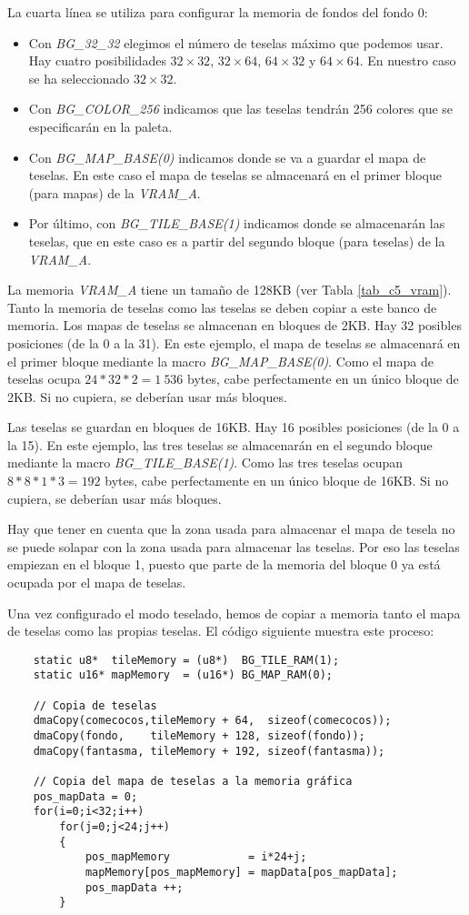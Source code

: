 La cuarta línea se utiliza para configurar la memoria de fondos del fondo 0:
\begin{itemize}
	\item Con \textit{BG\_32\_32} elegimos el número de teselas máximo que podemos usar. Hay cuatro posibilidades $32\times32$, $32\times64$, $64\times32$ y $64\times64$. En nuestro caso se ha seleccionado $32\times32$.
	\item Con \textit{BG\_COLOR\_256} indicamos que las teselas tendrán 256 colores que se especificarán en la paleta.
	\item Con \textit{ BG\_MAP\_BASE(0)} indicamos donde se va a guardar el mapa de teselas. En este caso el mapa de teselas se almacenará en el primer bloque (para mapas) de la \textit{VRAM\_A}.
	\item Por último, con \textit{BG\_TILE\_BASE(1)} indicamos donde se almacenarán las teselas, que en este caso es a partir del segundo bloque (para teselas) de la \textit{VRAM\_A}.
\end{itemize}
  

La memoria \textit{VRAM\_A} tiene un tamaño de 128KB (ver Tabla \ref{tab_c5_vram}). Tanto la memoria de teselas como las teselas se deben copiar a este banco de memoria. Los mapas de teselas se almacenan en bloques de 2KB. Hay 32 posibles posiciones (de la 0 a la 31). En este ejemplo, el mapa de teselas se almacenará en el primer bloque mediante la macro \textit{BG\_MAP\_BASE(0)}. Como el mapa de teselas ocupa $24*32*2 = 1\ 536$ bytes, cabe perfectamente en un único bloque de 2KB. Si no cupiera, se deberían usar más bloques.

Las teselas se guardan en bloques de 16KB. Hay 16 posibles posiciones (de la 0 a la 15). En este ejemplo, las tres teselas se almacenarán en el segundo bloque mediante la macro \textit{BG\_TILE\_BASE(1)}. Como las tres teselas ocupan $8*8*1*3 = 192$ bytes, cabe perfectamente en un único bloque de 16KB. Si no cupiera, se deberían usar más bloques. 

Hay que tener en cuenta que la zona usada para almacenar el mapa de tesela no se puede solapar con la zona usada para almacenar las teselas. Por eso las teselas empiezan en el bloque 1, puesto que parte de la memoria del bloque 0 ya está ocupada por el mapa de teselas.

Una vez configurado el modo teselado, hemos de copiar a memoria tanto el mapa de teselas como las propias teselas. El código siguiente muestra este proceso:

\begin{lstlisting}
	static u8*  tileMemory = (u8*)  BG_TILE_RAM(1);
	static u16* mapMemory  = (u16*) BG_MAP_RAM(0);

	// Copia de teselas
	dmaCopy(comecocos,tileMemory + 64,  sizeof(comecocos));
	dmaCopy(fondo,    tileMemory + 128, sizeof(fondo));
	dmaCopy(fantasma, tileMemory + 192, sizeof(fantasma));

	// Copia del mapa de teselas a la memoria gráfica
	pos_mapData = 0;
	for(i=0;i<32;i++)
		for(j=0;j<24;j++)
		{
			pos_mapMemory            = i*24+j;
			mapMemory[pos_mapMemory] = mapData[pos_mapData];
			pos_mapData ++;
		}
\end{lstlisting}

